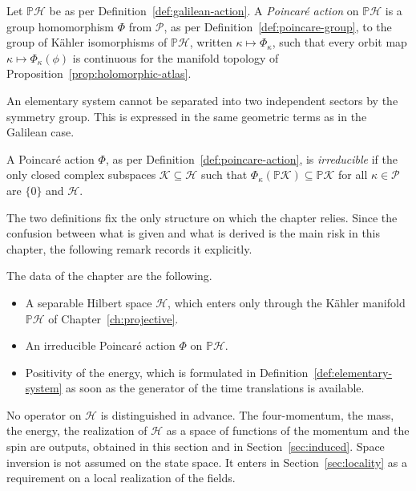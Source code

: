 	\begin{definition}\label{def:poincare-action}
		Let $\mathbb{P}\mathcal{H}$ be as per Definition~\ref{def:galilean-action}. A \emph{Poincar\'e action} on $\mathbb{P}\mathcal{H}$ is a group homomorphism $\Phi$ from $\mathcal{P}$, as per Definition~\ref{def:poincare-group}, to the group of Kähler isomorphisms of $\mathbb{P}\mathcal{H}$, written $\kappa\mapsto\Phi_\kappa$, such that every orbit map $\kappa\mapsto\Phi_\kappa(\phi)$ is continuous for the manifold topology of Proposition~\ref{prop:holomorphic-atlas}.
	\end{definition}
	
	An elementary system cannot be separated into two independent sectors by the symmetry group. This is expressed in the same geometric terms as in the Galilean case.
	
	\begin{definition}\label{def:poincare-irreducible}
		A Poincar\'e action $\Phi$, as per Definition~\ref{def:poincare-action}, is \emph{irreducible} if the only closed complex subspaces $\mathcal{K}\subseteq\mathcal{H}$ such that $\Phi_\kappa(\mathbb{P}\mathcal{K})\subseteq\mathbb{P}\mathcal{K}$ for all $\kappa\in\mathcal{P}$ are $\{0\}$ and $\mathcal{H}$.
	\end{definition}
	
	The two definitions fix the only structure on which the chapter relies. Since the confusion between what is given and what is derived is the main risk in this chapter, the following remark records it explicitly.
	
	\begin{remark}\label{rem:setting}
		The data of the chapter are the following.
		\begin{itemize}
			\item A separable Hilbert space $\mathcal{H}$, which enters only through the Kähler manifold $\mathbb{P}\mathcal{H}$ of Chapter~\ref{ch:projective}.
			\item An irreducible Poincar\'e action $\Phi$ on $\mathbb{P}\mathcal{H}$.
			\item Positivity of the energy, which is formulated in Definition~\ref{def:elementary-system} as soon as the generator of the time translations is available.
		\end{itemize}
		No operator on $\mathcal{H}$ is distinguished in advance. The four-momentum, the mass, the energy, the realization of $\mathcal{H}$ as a space of functions of the momentum and the spin are outputs, obtained in this section and in Section~\ref{sec:induced}. Space inversion is not assumed on the state space. It enters in Section~\ref{sec:locality} as a requirement on a local realization of the fields.
	\end{remark}
	
